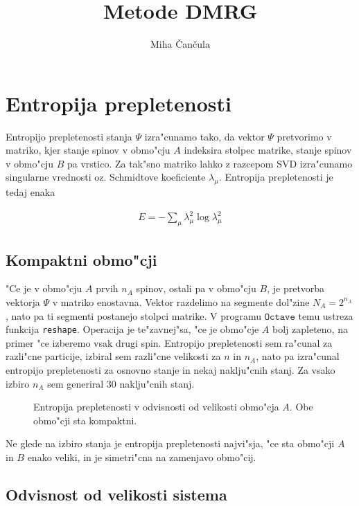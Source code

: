 \documentclass[a4paper,10pt]{article}
\title{Metode \textsc{DMRG}}
\author{Miha \v Can\v cula}
\begin{document}
\maketitle

\section{Entropija prepletenosti}

Entropijo prepletenosti stanja $\Psi$ izra"cunamo tako, da vektor $\Psi$ pretvorimo v matriko, kjer stanje spinov v obmo"cju $A$ indeksira stolpec matrike, stanje spinov v obmo"cju $B$ pa vrstico. Za tak"sno matriko lahko z razcepom \textsc{SVD} izra"cunamo singularne vrednosti oz. Schmidtove koeficiente $\lambda_\mu$. Entropija prepletenosti je tedaj enaka

\begin{align}
 E = -\sum_\mu \lambda_\mu^2 \log \lambda_\mu^2
\end{align}

\subsection{Kompaktni obmo"cji}

"Ce je v obmo"cju $A$ prvih $n_A$ spinov, ostali pa v obmo"cju $B$, je pretvorba vektorja $\Psi$ v matriko enostavna. Vektor razdelimo na segmente dol"zine $N_A = 2^{n_A}$, nato pa ti segmenti postanejo stolpci matrike. V programu $\texttt{Octave}$ temu ustreza funkcija \texttt{reshape}. Operacija je te"zavnej"sa, "ce je obmo"cje $A$ bolj zapleteno, na primer "ce izberemo vsak drugi spin. Entropijo prepletenosti sem ra"cunal za razli"cne particije, izbiral sem razli"cne velikosti za $n$ in $n_A$, nato pa izra"cunal entropijo prepletenosti za osnovno stanje in nekaj naklju"cnih stanj. Za vsako izbiro $n_A$ sem generiral 30 naklju"cnih stanj. 

\begin{figure}[H]
 \centering
 
 \caption{Entropija prepletenosti v odvisnosti od velikosti obmo"cja $A$. Obe obmo"cji sta kompaktni. }
 \label{fig:entropija}
\end{figure}

Ne glede na izbiro stanja je entropija prepletenosti najvi"sja, "ce sta obmo"cji $A$ in $B$ enako veliki, in je simetri"cna na zamenjavo obmo"cij. 

\subsection{Odvisnost od velikosti sistema}
\end{document}
